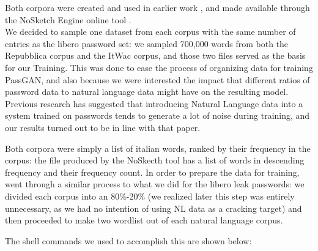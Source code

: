Both corpora were created and used in earlier work \cite{baroni2004introducing,baroni2009wacky}, and made available through the NoSketch Engine online tool \cite{nosketch_engine}.\\
We decided to sample one dataset from each corpus with the same number of entries as the libero password set: we sampled 700,000 words from both the Repubblica corpus and the ItWac corpus, and those two files served as the basis for our Training. This was done to ease the process of organizing data for training PassGAN, and also because we were interested the impact that different ratios of password data to natural language data might have on the resulting model.
Previous research \cite{Melicher2016} has suggested that introducing Natural Language data into a system trained on passwords tends to generate a lot of noise during training, and our results turned out to be in line with that paper.

Both corpora were simply a list of italian words, ranked by their frequency in the corpus: the file produced by the NoSkecth tool has a list of words in descending frequency and their frequency count.
In order to prepare the data for training, went through a similar process to what we did for the libero leak passwords: we divided each corpus into an 80\%-20\% (we realized later this step was entirely unnecessary, as we had no intention of using NL data as a cracking target) and then proceeded to make two wordlist out of each natural language corpus.

The shell commands we used to accomplish this are shown below:


